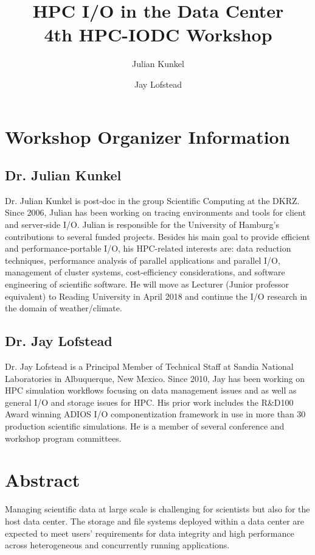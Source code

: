 \documentclass[a4paper,10pt]{article}
\title{HPC I/O in the Data Center\\ {\normalsize 4th HPC-IODC Workshop}}
\author{Julian Kunkel \and Jay Lofstead}
\begin{document}
\maketitle

\section{Workshop Organizer Information}

\subsection{Dr. Julian Kunkel}

Dr. Julian Kunkel is post-doc in the group Scientific Computing at the DKRZ.
Since 2006, Julian has been working on tracing environments and tools for client and server-side I/O.
Julian is responsible for the University of Hamburg's contributions to several funded projects.
Besides his main goal to provide efficient and performance-portable I/O, his HPC-related interests are: data reduction techniques, performance analysis of parallel applications and parallel I/O, management of cluster systems, cost-efficiency considerations, and software engineering of scientific software.
He will move as Lecturer (Junior professor equivalent) to Reading University in April 2018 and continue the I/O research in the domain of weather/climate.


\subsection{Dr. Jay Lofstead}

Dr. Jay Lofstead is a Principal Member of Technical Staff at Sandia National
Laboratories in Albuquerque, New Mexico. Since 2010, Jay has been working on
HPC simulation workflows focusing on data management issues and as well as
general I/O and storage issues for HPC.  His prior work includes the R\&D100
Award winning ADIOS I/O componentization framework in use in more than 30
production scientific simulations. He is a member of several conference and
workshop program committees.

\section{Abstract}
Managing scientific data at large scale is challenging for scientists but also for the host data center.
The storage and file systems deployed within a data center are expected to meet users' requirements for data integrity and high performance across heterogeneous and concurrently running applications.
\end{document}
